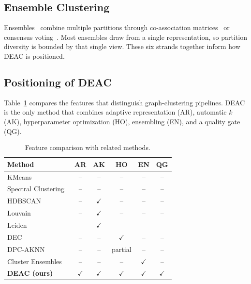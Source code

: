 \documentclass[journal]{IEEEtran}
\begin{document}
\subsection{Ensemble Clustering}
Ensembles~\cite{strehl2002cluster} combine multiple partitions through co-association matrices~\cite{fred2005combining} or consensus voting~\cite{vega2011survey}. Most ensembles draw from a single representation, so partition diversity is bounded by that single view. These six strands together inform how DEAC is positioned.

\subsection{Positioning of DEAC}
Table~\ref{tab:related} compares the features that distinguish graph-clustering pipelines. DEAC is the only method that combines adaptive representation (AR), automatic $k$ (AK), hyperparameter optimization (HO), ensembling (EN), and a quality gate (QG).

\begin{table}[htbp]
\centering
\caption{Feature comparison with related methods.}
\label{tab:related}
\footnotesize
\setlength{\tabcolsep}{3pt}
\begin{tabular}{lccccc}
\toprule
Method & AR & AK & HO & EN & QG \\
\midrule
KMeans~\cite{lloyd1982least} & -- & -- & -- & -- & -- \\
Spectral Clustering~\cite{ng2001spectral} & -- & -- & -- & -- & -- \\
HDBSCAN~\cite{campello2013density} & -- & $\checkmark$ & -- & -- & -- \\
Louvain~\cite{blondel2008fast} & -- & $\checkmark$ & -- & -- & -- \\
Leiden~\cite{traag2019louvain} & -- & $\checkmark$ & -- & -- & -- \\
DEC~\cite{xie2016unsupervised} & -- & -- & $\checkmark$ & -- & -- \\
DPC-AKNN~\cite{wang2026density} & -- & -- & partial & -- & -- \\
Cluster Ensembles~\cite{strehl2002cluster} & -- & -- & -- & $\checkmark$ & -- \\
\textbf{DEAC (ours)} & $\checkmark$ & $\checkmark$ & $\checkmark$ & $\checkmark$ & $\checkmark$ \\
\bottomrule
\end{tabular}
\end{table}

\end{document}

